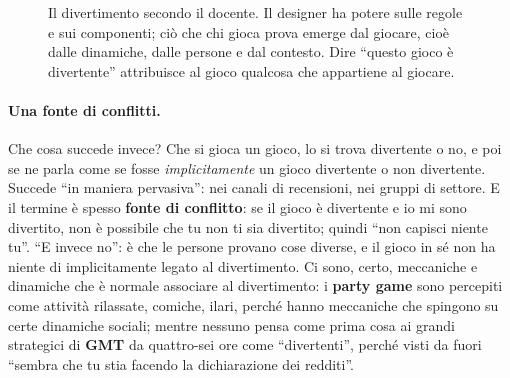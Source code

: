 \begin{figure}[htbp]
\centering
{}
\caption{Il divertimento secondo il docente. Il designer ha potere sulle regole e
sui componenti; ciò che chi gioca prova emerge dal giocare, cioè dalle dinamiche,
dalle persone e dal contesto. Dire ``questo gioco è divertente'' attribuisce al
gioco qualcosa che appartiene al giocare.}
\label{a5:fig:gameplay}
\end{figure}

\paragraph{Una fonte di conflitti.} Che cosa succede invece? Che si gioca un gioco,
lo si trova divertente o no, e poi se ne parla come se fosse \emph{implicitamente}
un gioco divertente o non divertente. Succede ``in maniera pervasiva'': nei canali
di recensioni, nei gruppi di settore. E il termine è spesso \textbf{fonte di
conflitto}: se il gioco è divertente e io mi sono divertito, non è possibile che tu
non ti sia divertito; quindi ``non capisci niente tu''. ``E invece no'': è che le
persone provano cose diverse, e il gioco in sé non ha niente di implicitamente
legato al divertimento. Ci sono, certo, meccaniche e dinamiche che è normale
associare al divertimento: i \textbf{party game} sono percepiti come attività
rilassate, comiche, ilari, perché hanno meccaniche che spingono su certe dinamiche
sociali; mentre nessuno pensa come prima cosa ai grandi strategici di
\textbf{GMT} da quattro-sei ore come ``divertenti'', perché visti da fuori
``sembra che tu stia facendo la dichiarazione dei redditi''.

